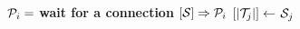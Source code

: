 \documentclass{article}
\begin{document}
\pagestyle{empty}

\newcommand{\send}{\Rightarrow}
\newcommand{\sendto}{\rightarrow}
\newcommand{\recv}{\Leftarrow}
\algrenewcommand{}

\begin{algorithmic}

  \State  ${\cal P}_i=$ \textbf{wait for a connection}
  \State $[{\cal S}] \send {\cal P}_i$
  \EndWhile
  \EndProcedure
  \newline
  \State $[|{\cal T}_j|] \gets$ ${\cal S}_j$
  \EndWhile
  \EndProcedure

\end{algorithmic}
\end{document}
